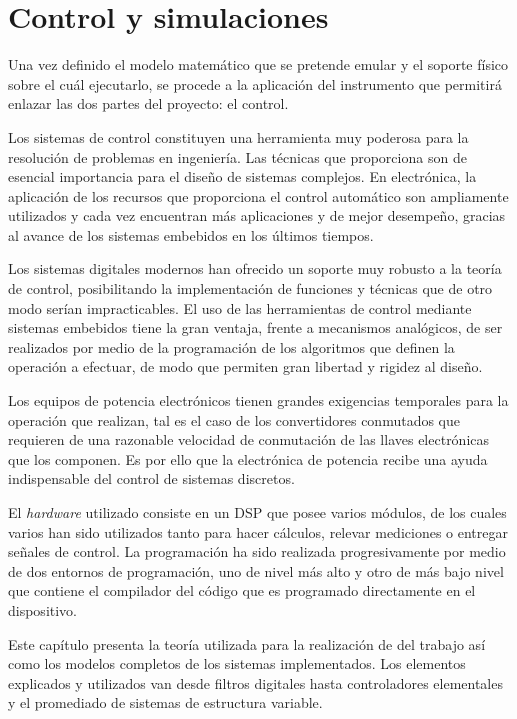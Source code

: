 \chapter{Control y simulaciones}
\label{ch:control}
Una vez definido el modelo matemático que se pretende emular y el soporte físico sobre el cuál ejecutarlo, se procede a la aplicación del instrumento
que permitirá enlazar las dos partes del proyecto: el control.

Los sistemas de control constituyen una herramienta muy poderosa para la resolución de problemas en ingeniería. Las técnicas que proporciona son de
esencial importancia para el diseño de sistemas complejos. En electrónica, la aplicación de los recursos que proporciona el control automático son
ampliamente utilizados y cada vez encuentran más aplicaciones y de mejor desempeño, gracias al avance de los sistemas embebidos en los últimos tiempos.

Los sistemas digitales modernos han ofrecido un soporte muy robusto a la teoría de control, posibilitando la implementación de funciones y técnicas
que de otro modo serían impracticables. El uso de las herramientas de control mediante sistemas embebidos tiene la gran ventaja, frente a 
mecanismos analógicos, de ser realizados por medio de la programación de los algoritmos que definen la operación a efectuar, de modo que permiten
gran libertad y rigidez al diseño.

Los equipos de potencia electrónicos tienen grandes exigencias temporales para la operación que realizan, tal es el caso de los convertidores conmutados
que requieren de una razonable velocidad de conmutación de las llaves electrónicas que los componen. Es por ello que la electrónica de potencia recibe una
ayuda indispensable del control de sistemas discretos.

El \emph{hardware} utilizado consiste en un DSP que posee varios módulos, de los cuales varios han sido utilizados tanto para hacer cálculos, relevar
mediciones o entregar señales de control. La programación ha sido realizada progresivamente por medio de dos entornos de programación, uno de nivel más
alto y otro de más bajo nivel que contiene el compilador del código que es programado directamente en el dispositivo.

Este capítulo presenta la teoría utilizada para la realización de del trabajo así como los modelos completos de los sistemas implementados. Los elementos
explicados y utilizados van desde filtros digitales hasta controladores elementales y el promediado de sistemas de estructura variable.

